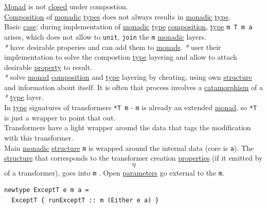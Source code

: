 \documentclass[11pt]{article}
\begin{document}
\begin{enumerate}
\hyperref[org268aaf1]{Monad} is not \hyperref[orgfa67abb]{closed} under compostion.\\
\hyperref[org24a8abd]{Composition} of \hyperref[org5cc37ea]{monadic} \hyperref[org3927fd9]{types} does not always results in \hyperref[org5cc37ea]{monadic} \hyperref[org4fbaeb8]{type}.\\

Basic \hyperref[org96bceb0]{case}: during implementation of \hyperref[org5cc37ea]{monadic} \hyperref[org4fbaeb8]{type} \hyperref[org24a8abd]{composition}, \hyperref[org4fbaeb8]{type} \texttt{m T m a} arises, which does not allow to \texttt{unit}, \texttt{join} the \texttt{m} \hyperref[org5cc37ea]{monadic} layers.\\

\emph{*} have desirable properies and can add them to \hyperref[org3ecde32]{monads}. \emph{*} user their implementation to solve the compostion \hyperref[org4fbaeb8]{type} layering and allow to attach desirable \hyperref[org07ca26b]{property} to result.\\

\emph{*} solve \hyperref[org268aaf1]{monad} \hyperref[org24a8abd]{composition} and \hyperref[org4fbaeb8]{type} layering by cheating, using own \hyperref[org93ee82c]{structure} and information about itself. It is often that process involves a \hyperref[org9f46ed9]{catamorphism} of a \emph{*} \hyperref[org4fbaeb8]{type} layer.\\

In \hyperref[org4fbaeb8]{type} signatures of transformers \texttt{*T m} - \texttt{m} is already an extended \hyperref[org268aaf1]{monad}, so \texttt{*T} is just a wrapper to point that out.\\

Transformers have a light wrapper around the data that tags the modification with this transformer.\\

Main \hyperref[org5cc37ea]{monadic} \hyperref[org93ee82c]{structure} \texttt{m} is wrapped around the internal data (core is \texttt{a}). The \hyperref[org93ee82c]{structure} that corresponds to the transformer creation \hyperref[org763ad6b]{properties} (if it emitted by $$ \eta $$ of a transformer), goes into \texttt{m} . Open \hyperref[orgbeb3b81]{parameters} go external to the \texttt{m}.\\

\begin{verbatim}
newtype ExceptT e m a =
  ExceptT { runExceptT :: m (Either e a) }


\end{verbatim}
\end{enumerate}
\end{document}
